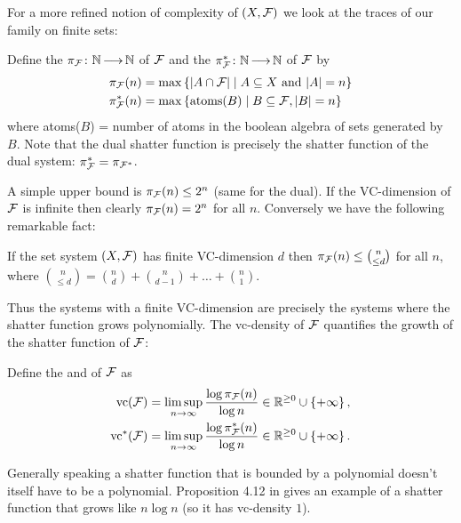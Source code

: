 For a more refined notion of complexity of $(X, \mathcal F)$ we look at the traces of our family on finite sets:
\begin{Definition}
  Define the  $\pi_\mathcal F \colon \mathbb{N} \operatorname{\longrightarrow} \mathbb{N}$ of $\mathcal F$ and the  $\pi^*_\mathcal F \colon \mathbb{N} \operatorname{\longrightarrow} \mathbb{N}$ of $\mathcal F$ by 
  \begin{align*}
    \pi_\mathcal F(n) &= \max \left\{|A \cap \mathcal F| \mid A \subseteq X \text{ and } |A| = n\right\} \\
    \pi^*_\mathcal F(n) &= \max \left\{\text{atoms($B$)} \mid B \subseteq \mathcal F, |B| = n\right\}
  \end{align*}
  where atoms($B$) = number of atoms in the boolean algebra of sets generated by $B$.
  Note that the dual shatter function is precisely the shatter function of the dual system: $\pi^*_\mathcal F = \pi_{\mathcal F^*}$.
\end{Definition}  

A simple upper bound is $\pi_\mathcal F(n) \leq 2^n$ (same for the dual).
If the VC-dimension of $\mathcal F$ is infinite then clearly $\pi_\mathcal F(n) = 2^n$ for all $n$. Conversely we have the following remarkable fact:
\begin{Theorem} 
  If the set system $(X, \mathcal F)$ has finite VC-dimension $d$ then $\pi_\mathcal F(n) \leq {n \choose \leq d}$ for all $n$, where
  ${n \choose \leq d} = {n \choose d} + {n \choose d - 1} + \ldots + {n \choose 1}$.    
\end{Theorem}

Thus the systems with a finite VC-dimension are precisely the systems where the shatter function grows polynomially.
The vc-density of $\mathcal F$ quantifies the growth of the shatter function of $\mathcal F$: 
\begin{Definition}
  Define the  and  of $\mathcal F$ as
  \begin{align*}
    \operatorname{vc}(\mathcal F) &= \limsup_{n \to \infty}\frac{\log \pi_\mathcal F(n)}{\log n} \in \mathbb{R}^{\geq 0} \cup \left\{+\infty\right\},\\
    \operatorname{vc}^*(\mathcal F) &= \limsup_{n \to \infty}\frac{\log \pi^*_\mathcal F(n)}{\log n}\in \mathbb{R}^{\geq 0} \cup \left\{+\infty\right\}.
  \end{align*}
\end{Definition}

Generally speaking a shatter function that is bounded by a polynomial doesn't itself have to be a polynomial.
Proposition 4.12 in \cite{density} gives an example of a shatter function that grows like $n \log n$ (so it has vc-density $1$).

